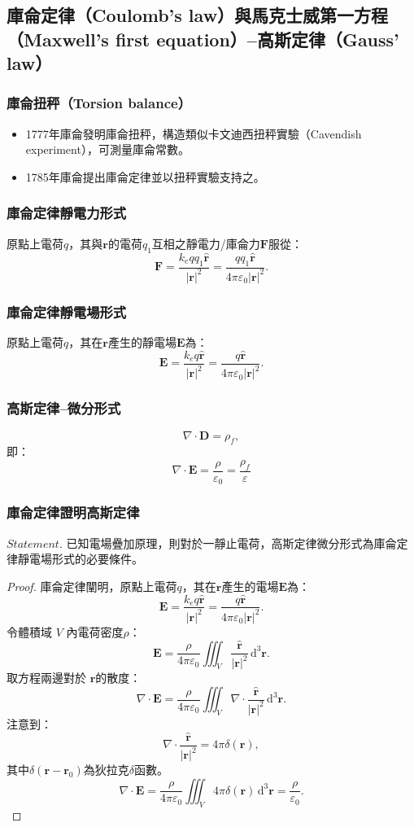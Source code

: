 \documentclass[a4paper,12pt]{report}
\begin{document}
\begin{itemize}
\subsection{庫侖定律（Coulomb's law）與馬克士威第一方程（Maxwell's first equation）–高斯定律（Gauss' law）}
\subsubsection{庫侖扭秤（Torsion balance）}
\begin{itemize}
\item 1777年庫侖發明庫侖扭秤，構造類似卡文迪西扭秤實驗（Cavendish experiment），可測量庫侖常數。
\item 1785年庫侖提出庫侖定律並以扭秤實驗支持之。
\end{itemize}
\subsubsection{庫侖定律靜電力形式}
原點上電荷$q$，其與$\mathbf{r}$的電荷$q_1$互相之靜電力/庫侖力$\mathbf{F}$服從：
\[ \mathbf{F} = \frac{k_eqq_1\hat{\mathbf{r}}}{|\mathbf{r}|^2}=\frac{qq_1\hat{\mathbf{r}}}{4\pi\varepsilon_0|\mathbf{r}|^2}.\]
\subsubsection{庫侖定律靜電場形式}
原點上電荷$q$，其在$\mathbf{r}$產生的靜電場$\mathbf{E}$為：
\[\mathbf{E}=\frac{k_eq\hat{\mathbf{r}}}{|\mathbf{r}|^2}=\frac{q\hat{\mathbf{r}}}{4\pi\varepsilon_0|\mathbf{r}|^2}.\]
\subsubsection{高斯定律–微分形式}
\[\nabla\cdot\mathbf{D}=\rho_f,\]
即：
\[\nabla\cdot\mathbf{E}=\frac{\rho}{\varepsilon_0}=\frac{\rho_f}{\varepsilon}\]
\subsubsection{庫侖定律證明高斯定律}
\(\textit{Statement.}\) 已知電場疊加原理，則對於一靜止電荷，高斯定律微分形式為庫侖定律靜電場形式的必要條件。
\begin{proof}
庫侖定律闡明，原點上電荷$q$，其在$\mathbf{r}$產生的電場$\mathbf{E}$為：
\[\mathbf{E}=\frac{k_eq\hat{\mathbf{r}}}{|\mathbf{r}|^2}=\frac{q\hat{\mathbf{r}}}{4\pi\varepsilon_0|\mathbf{r}|^2}.\]
令體積域 $V$ 內電荷密度$\rho$：
\[\mathbf{E}=\frac{\rho}{4\pi\varepsilon_0}\iiint_V\frac{\hat{\mathbf{r}}}{|\mathbf{r}|^2}\,\mathrm{d}^{3}\mathbf{r}.\]
取方程兩邊對於 $ \mathbf {r} $的散度：
\[\nabla\cdot\mathbf{E}=\frac{\rho}{4\pi\varepsilon_0}\iiint_V\nabla\cdot\frac{\hat{\mathbf{r}}}{|\mathbf{r}|^2}\,\mathrm{d}^{3}\mathbf{r}.\]
注意到：
\[\nabla\cdot\frac{\hat{\mathbf{r}}}{|\mathbf{r}|^2}=4\pi\delta(\mathbf{r}),\]
其中$\delta(\mathbf{r}-\mathbf{r}_0)$為狄拉克$\delta$函數。
\[\nabla\cdot\mathbf{E}=\frac{\rho}{4\pi\varepsilon_0}\iiint_V4\pi\delta(\mathbf{r})\,\mathrm{d}^{3}\mathbf{r}=\frac{\rho}{\varepsilon_0}.\]
\end{proof}

\end{itemize}
\end{document}
